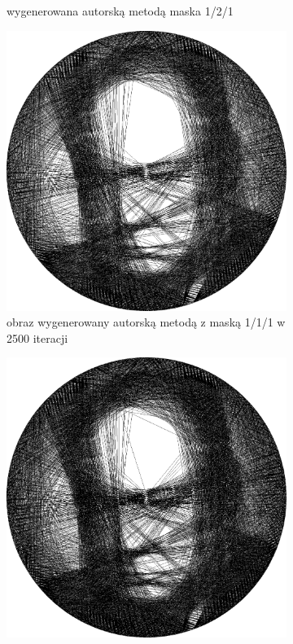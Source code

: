 \begin{figure}[H]
\begin{subfigure}{0.24\textwidth}
            \caption{wygenerowana autorską metodą maska 1/2/1}
            \label{comp-comp-churchill-f}
        \end{subfigure}
        \begin{subfigure}{0.24\textwidth}
            \centering
            \includegraphics[width = \textwidth]{img/6-comp/churchill_e_i2500_c20_inv0_bg1_obj1_ed1.png}
            \caption{obraz wygenerowany autorską metodą z maską 1/1/1 w 2500 iteracji}
            \label{comp-comp-churchill-d}
        \end{subfigure}
        \begin{subfigure}{0.24\textwidth}
            \centering
            \includegraphics[width = \textwidth]{img/6-comp/churchill_e_i3000_c20_inv0_bg1_obj1_ed1.png}

\end{subfigure}
\end{figure}
